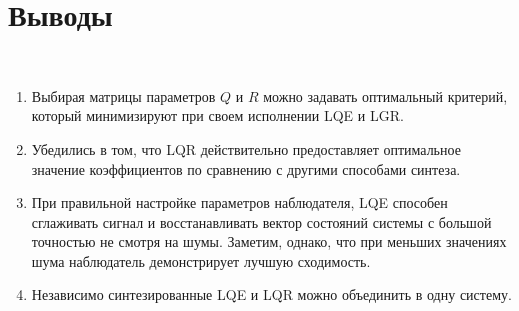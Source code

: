 \section{Выводы}\
\begin{enumerate}
    \item Выбирая матрицы параметров $Q$ и $R$ можно задавать оптимальный критерий, который минимизируют при своем исполнении LQE и LGR.
    \item Убедились в том, что LQR действительно предоставляет оптимальное значение коэффициентов по сравнению с другими способами синтеза.
    \item При правильной настройке параметров наблюдателя, LQE способен сглаживать сигнал и восстанавливать вектор состояний системы с большой точностью не смотря на шумы. Заметим, однако, что при меньших значениях шума наблюдатель демонстрирует лучшую сходимость.
    \item Независимо синтезированные LQE и LQR можно объединить в одну систему.
\end{enumerate}
